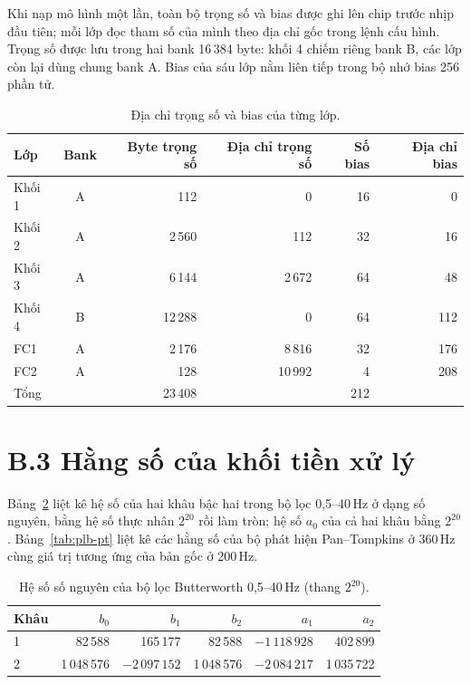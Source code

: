 Khi nạp mô hình một lần, toàn bộ trọng số và bias được ghi lên chip trước nhịp đầu tiên; mỗi lớp đọc tham số của mình theo địa chỉ gốc trong lệnh cấu hình.
Trọng số được lưu trong hai bank 16\,384 byte: khối 4 chiếm riêng bank B, các lớp còn lại dùng chung bank A.
Bias của sáu lớp nằm liên tiếp trong bộ nhớ bias 256 phần tử.

\begin{table}[htbp]
  \centering
  \caption{Địa chỉ trọng số và bias của từng lớp.}\label{tab:plb-mem}
  \begin{tabular}{lcrrrr}
    \toprule
    Lớp & Bank & Byte trọng số & Địa chỉ trọng số & Số bias & Địa chỉ bias \\
    \midrule
    Khối 1 & A & 112     & 0       & 16 & 0   \\
    Khối 2 & A & 2\,560  & 112     & 32 & 16  \\
    Khối 3 & A & 6\,144  & 2\,672  & 64 & 48  \\
    Khối 4 & B & 12\,288 & 0       & 64 & 112 \\
    FC1    & A & 2\,176  & 8\,816  & 32 & 176 \\
    FC2    & A & 128     & 10\,992 & 4  & 208 \\
    \midrule
    Tổng   &   & 23\,408 &         & 212 & \\
    \bottomrule
  \end{tabular}
\end{table}

\section*{B.3 Hằng số của khối tiền xử lý}

Bảng~\ref{tab:plb-loc} liệt kê hệ số của hai khâu bậc hai trong bộ lọc 0{,}5--40\,Hz ở dạng số nguyên, bằng hệ số thực nhân $2^{20}$ rồi làm tròn; hệ số $a_0$ của cả hai khâu bằng $2^{20}$.
Bảng~\ref{tab:plb-pt} liệt kê các hằng số của bộ phát hiện Pan--Tompkins ở 360\,Hz cùng giá trị tương ứng của bản gốc ở 200\,Hz.

\begin{table}[htbp]
  \centering
  \caption{Hệ số số nguyên của bộ lọc Butterworth 0{,}5--40\,Hz (thang $2^{20}$).}\label{tab:plb-loc}
  \begin{tabular}{lrrrrr}
    \toprule
    Khâu & $b_0$ & $b_1$ & $b_2$ & $a_1$ & $a_2$ \\
    \midrule
    1 & 82\,588 & 165\,177 & 82\,588 & $-1\,118\,928$ & 402\,899 \\
    2 & 1\,048\,576 & $-2\,097\,152$ & 1\,048\,576 & $-2\,084\,217$ & 1\,035\,722 \\
    \bottomrule
  \end{tabular}
\end{table}

